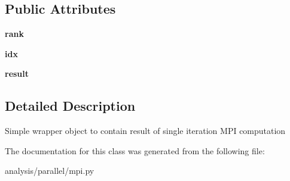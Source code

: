 \subsection*{Public Attributes}
\begin{DoxyCompactItemize}
\item 
\hypertarget{classseren3_1_1analysis_1_1parallel_1_1mpi_1_1Result_a5091dadf2d89ac97f1c9b0fd8b9a677f}{
{\bfseries rank}}
\label{classseren3_1_1analysis_1_1parallel_1_1mpi_1_1Result_a5091dadf2d89ac97f1c9b0fd8b9a677f}

\item 
\hypertarget{classseren3_1_1analysis_1_1parallel_1_1mpi_1_1Result_ad0cde82892ef6455c869ad2a2c5f0977}{
{\bfseries idx}}
\label{classseren3_1_1analysis_1_1parallel_1_1mpi_1_1Result_ad0cde82892ef6455c869ad2a2c5f0977}

\item 
\hypertarget{classseren3_1_1analysis_1_1parallel_1_1mpi_1_1Result_a4841c4318735311cc4d5bb5aab3f0016}{
{\bfseries result}}
\label{classseren3_1_1analysis_1_1parallel_1_1mpi_1_1Result_a4841c4318735311cc4d5bb5aab3f0016}

\end{DoxyCompactItemize}


\subsection{Detailed Description}
\begin{DoxyVerb}
Simple wrapper object to contain result of single iteration MPI computation
\end{DoxyVerb}
 

The documentation for this class was generated from the following file:\begin{DoxyCompactItemize}
\item 
analysis/parallel/mpi.py\end{DoxyCompactItemize}
